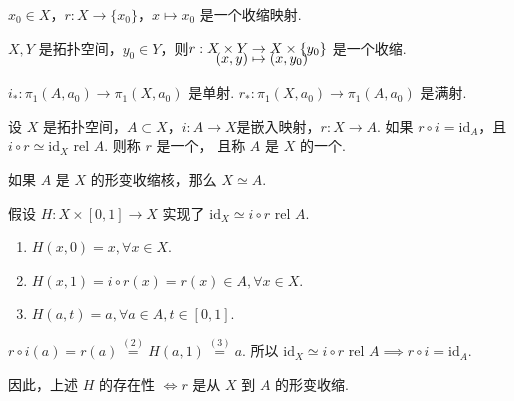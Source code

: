 \begin{instance}
    $x_0 \in X$，$r: X \to \{x_0\}$，$x \mapsto x_0$ 是一个收缩映射.
\end{instance}

\begin{instance}
    $X, Y$ 是拓扑空间，$y_0 \in Y$，则$\setjot[-5]\begin{aligned}[t]
         r: X \times Y &\to X \times \{y_0\}
         \\(x, y) &\mapsto (x, y_0)
    \end{aligned}$ 是一个收缩.
\end{instance}

\begin{remark}
    $i_*: \pi_1(A, a_0) \to \pi_1(X, a_0)$ 是单射.
    $r_*: \pi_1(X, a_0) \to \pi_1(A, a_0)$ 是满射.
\end{remark}

\begin{definition}[形变收缩映射][def:10.19]
    设 $X$ 是拓扑空间，$A \subset X$，$i: A \to X$是嵌入映射，$r: X \to A$.
    如果 $r \circ i = \mathrm{id}_A$，且 $i \circ r \simeq \mathrm{id}_X \text{ rel } A$.
    则称 $r$ 是一个，
    且称 $A$ 是 $X$ 的一个.
\end{definition}

\begin{remark}
    如果 $A$ 是 $X$ 的形变收缩核，那么 $X \simeq A$.
\end{remark}

假设 $H: X \times [0,1] \to X$ 实现了 $\mathrm{id}_X \simeq i \circ r \text{ rel } A$.
\begin{enumerate}
    \item $H(x, 0) = x, \forall x \in X$.
    \item $H(x, 1) = i \circ r(x) = r(x) \in A, \forall x \in X$.
    \item $H(a, t) = a, \forall a \in A, t \in [0,1]$.
\end{enumerate}

\begin{remark}
    $r \circ i(a) = r(a) \stackrel{(2)}{=} H(a, 1) \stackrel{(3)}{=} a$.
    所以 $\mathrm{id}_X \simeq i \circ r \text{ rel } A \implies r \circ i = \mathrm{id}_A$.\par
    因此，上述 $H$ 的存在性 $\iff r$ 是从 $X$ 到 $A$ 的形变收缩.
\end{remark}

